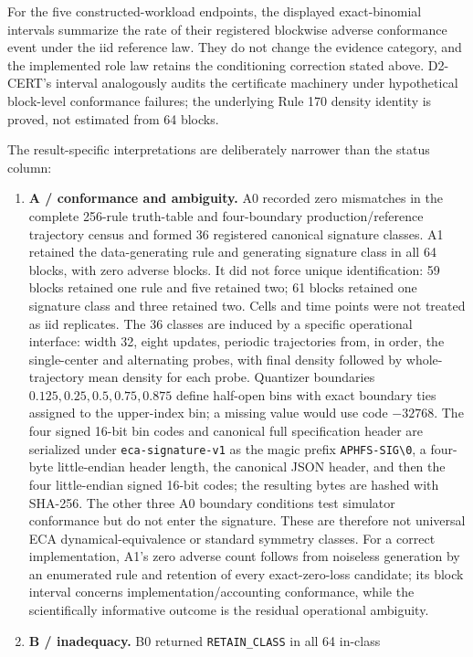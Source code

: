For the five constructed-workload endpoints, the displayed exact-binomial intervals summarize the
rate of their registered blockwise adverse conformance event under the iid reference law. They do
not change the evidence category, and the implemented role law retains the conditioning correction
stated above. D2-CERT's interval analogously audits the certificate machinery under hypothetical
block-level conformance failures; the underlying Rule 170 density identity is proved, not estimated
from 64 blocks.

The result-specific interpretations are deliberately narrower than the status column:

\begin{enumerate}
\item \textbf{A / conformance and ambiguity.} A0 recorded zero mismatches in the complete
256-rule truth-table and four-boundary production/reference trajectory census and formed 36 registered
canonical signature classes. A1 retained the data-generating rule and generating signature class
in all 64 blocks, with zero adverse blocks. It did not force unique identification: 59 blocks retained one rule and five
retained two; 61 blocks retained one signature class and three retained two. Cells and time points
were not treated as iid replicates.
The 36 classes are induced by a specific operational interface: width 32, eight updates, periodic
trajectories from, in order, the single-center and alternating probes, with final density followed by
whole-trajectory mean density for each probe. Quantizer boundaries
\(0.125,0.25,0.5,0.75,0.875\) define half-open bins with exact boundary ties assigned to the
upper-index bin; a missing value would use code \(-32768\). The four signed 16-bit bin codes and
canonical full specification header are serialized under \texttt{eca-signature-v1} as the magic
prefix \texttt{APHFS-SIG\textbackslash0}, a four-byte little-endian header length, the canonical
JSON header, and then the four little-endian signed 16-bit codes; the resulting bytes are hashed
with SHA-256. The other three A0 boundary conditions test
simulator conformance but do not enter the signature. These are therefore not universal ECA
dynamical-equivalence or standard symmetry classes. For a correct implementation, A1's zero adverse
count follows from noiseless generation by an enumerated rule and retention of every exact-zero-loss
candidate; its block interval concerns implementation/accounting conformance, while the
scientifically informative outcome is the residual operational ambiguity.
\item \textbf{B / inadequacy.} B0 returned \texttt{RETAIN\_CLASS} in all 64 in-class

\end{enumerate}
